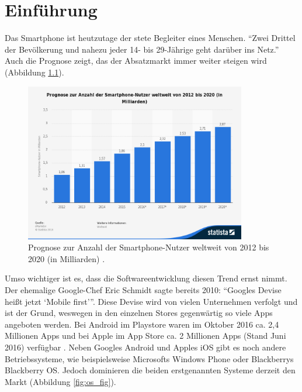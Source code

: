 \chapter{Einführung}\label{ch:intro}

Das Smartphone ist heutzutage der stete Begleiter eines Menschen. \enquote{Zwei Drittel der Bevölkerung und nahezu jeder 14- bis 29-Jährige geht darüber ins Netz.} \cite{usage} Auch die Prognose zeigt, das der Absatzmarkt immer weiter steigen wird (Abbildung \ref{fig:prognose_fig}).

\begin{figure}[H]
	\begin{center}
		\includegraphics[width=0.86\textwidth]{images/prognose-zur-anzahl-der-smartphone-nutzer-weltweit-bis-2020.png}
		\caption{Prognose zur Anzahl der Smartphone-Nutzer weltweit von 2012 bis 2020 (in Milliarden) \cite{prognose}.}
		\label{fig:prognose_fig}
	\end{center}
\end{figure}

Umso wichtiger ist es, dass die Softwareentwicklung diesen Trend ernst nimmt. Der ehemalige Google-Chef Eric Schmidt sagte bereits 2010: \enquote{Googles Devise heißt jetzt \enquote{Mobile first}}. 
Diese Devise wird von vielen Unternehmen verfolgt und ist der Grund, weswegen in den einzelnen Stores gegenwärtig so viele Apps angeboten werden. Bei Android im Playstore waren im Oktober 2016 ca. 2,4 Millionen Apps \cite{play_store} und bei Apple im App Store ca. 2 Millionen Apps (Stand Juni 2016) verfügbar \cite{app_store}. Neben Googles Android und Apples iOS gibt es noch andere Betriebssysteme, wie beispielsweise Microsofts Windows Phone oder Blackberrys Blackberry OS. Jedoch dominieren die beiden erstgenannten Systeme derzeit den Markt (Abbildung \ref{fig:os_fig}).


